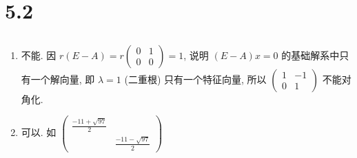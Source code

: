 \section{5.2}

 \subsection{} %
     \paragraph{} %
         \begin{enumerate}
             \item %
                   不能. 因 \( r(E - A) = r\begin{pmatrix}
                       0 & 1 \\
                       0 & 0
                   \end{pmatrix} = 1 \), 说明 \( (E - A)x = 0 \) 的基础解系中只有一个解向量, 即 \( \lambda = 1 \) (二重根) 只有一个特征向量, 所以 \( \begin{pmatrix}
                       1 & -1 \\
                       0 & 1
                   \end{pmatrix} \) 不能对角化.
             \item %
                   可以. 如 \( \begin{pmatrix}
                       \frac{-11 + \sqrt{97}}{2} &                           \\
                                                 & \frac{-11 - \sqrt{97}}{2}
                   \end{pmatrix} \)
         \end{enumerate}

